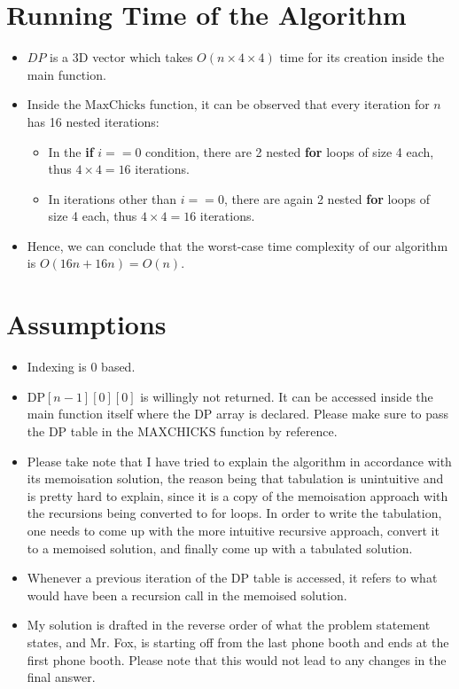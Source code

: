 \documentclass{article}
\begin{document}
\section{Running Time of the Algorithm}
\begin{itemize}

\item $DP$ is a 3D vector which takes $O(n \times 4 \times 4)$ time for its creation inside the main function.

\item Inside the $\text{MaxChicks}$ function, it can be observed that every iteration for $n$ has 16 nested iterations:
    \begin{itemize}
        \item In the \textbf{if} $i == 0$ condition, there are 2 nested \textbf{for} loops of size 4 each, thus $4 \times 4 = 16$ iterations.
        \item In iterations other than $i == 0$, there are again 2 nested \textbf{for} loops of size 4 each, thus $4 \times 4 = 16$ iterations.
    \end{itemize}

\item Hence, we can conclude that the worst-case time complexity of our algorithm is $O(16n + 16n) = O(n)$.

\end{itemize}

\section{Assumptions}
\begin{itemize}
    \item Indexing is 0 based.

    \item $\text{DP}[n - 1][0][0]$ is willingly not returned. It can be accessed inside the main function itself where the DP array is declared. Please make sure to pass the DP table in the $\text{MAXCHICKS}$ function by reference.
    \item Please take note that I have tried to explain the algorithm in accordance with its memoisation solution, the reason being that tabulation is unintuitive and is pretty hard to explain, since it is a copy of the memoisation approach with the recursions being converted to for loops. In order to write the tabulation, one needs to come up with the more intuitive recursive approach, convert it to a memoised solution, and finally come up with a tabulated solution.

    \item Whenever a previous iteration of the DP table is accessed, it refers to what would have been a recursion call in the memoised solution.

    \item My solution is drafted in the reverse order of what the problem statement states, and Mr. Fox, is starting off from the last phone booth and ends at the first phone booth. Please note that this would not lead to any changes in the final answer.
\end{itemize}
\end{document}
